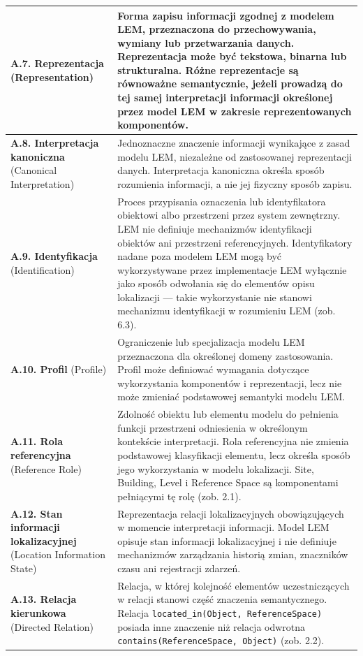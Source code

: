 \begin{longtable}{|p{}|p{}|}
\textbf{A.7. Reprezentacja} \newline (Representation) & Forma zapisu informacji zgodnej z modelem LEM, przeznaczona do przechowywania, wymiany lub przetwarzania danych. Reprezentacja może być tekstowa, binarna lub strukturalna. Różne reprezentacje są równoważne semantycznie, jeżeli prowadzą do tej samej interpretacji informacji określonej przez model LEM w zakresie reprezentowanych komponentów. \\ \hline
\textbf{A.8. Interpretacja kanoniczna} \newline (Canonical Interpretation) & Jednoznaczne znaczenie informacji wynikające z zasad modelu LEM, niezależne od zastosowanej reprezentacji danych. Interpretacja kanoniczna określa sposób rozumienia informacji, a nie jej fizyczny sposób zapisu. \\ \hline
\textbf{A.9. Identyfikacja} \newline (Identification) & Proces przypisania oznaczenia lub identyfikatora obiektowi albo przestrzeni przez system zewnętrzny. LEM nie definiuje mechanizmów identyfikacji obiektów ani przestrzeni referencyjnych. Identyfikatory nadane poza modelem LEM mogą być wykorzystywane przez implementacje LEM wyłącznie jako sposób odwołania się do elementów opisu lokalizacji — takie wykorzystanie nie stanowi mechanizmu identyfikacji w rozumieniu LEM (zob. 6.3). \\ \hline
\textbf{A.10. Profil} \newline (Profile) & Ograniczenie lub specjalizacja modelu LEM przeznaczona dla określonej domeny zastosowania. Profil może definiować wymagania dotyczące wykorzystania komponentów i reprezentacji, lecz nie może zmieniać podstawowej semantyki modelu LEM. \\ \hline
\textbf{A.11. Rola referencyjna} \newline (Reference Role) & Zdolność obiektu lub elementu modelu do pełnienia funkcji przestrzeni odniesienia w określonym kontekście interpretacji. Rola referencyjna nie zmienia podstawowej klasyfikacji elementu, lecz określa sposób jego wykorzystania w modelu lokalizacji. Site, Building, Level i Reference Space są komponentami pełniącymi tę rolę (zob. 2.1). \\ \hline
\textbf{A.12. Stan informacji lokalizacyjnej} \newline (Location Information State) & Reprezentacja relacji lokalizacyjnych obowiązujących w momencie interpretacji informacji. Model LEM opisuje stan informacji lokalizacyjnej i nie definiuje mechanizmów zarządzania historią zmian, znaczników czasu ani rejestracji zdarzeń. \\ \hline
\textbf{A.13. Relacja kierunkowa} \newline (Directed Relation) & Relacja, w której kolejność elementów uczestniczących w relacji stanowi część znaczenia semantycznego. Relacja \texttt{located\_in(Object, ReferenceSpace)} posiada inne znaczenie niż relacja odwrotna \texttt{contains(ReferenceSpace, Object)} (zob. 2.2). \\ \hline
\end{longtable}

